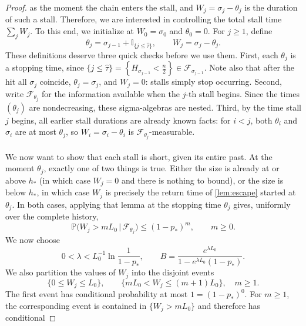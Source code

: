 \documentclass[
    aps,
    superscriptaddress,
    onecolumn,
    10pt,
    prx,
    nofootinbib
]{revtex4-2}
\theoremstyle{namedstatement}
\theoremstyle{plain}
\begin{document}
\begin{proof}
as the moment the chain enters the stall, and $W_j = \sigma_j - \theta_j$ is the duration of such a stall. Therefore, we are interested in controlling the total stall time $\sum_j W_j$. To this end, we initialize at $W_0=\sigma_0$ and
$\theta_0=0$. For $j\ge1$, define
\begin{equation}
  \theta_j=\sigma_{j-1}+\mathbb I_{\{j\le\widehat\tau\}},\qquad W_j=\sigma_j-\theta_j.
\end{equation}
These definitions deserve three quick checks before we use them. First, each $\theta_j$ is a stopping time, since $\{j \le \widehat{\tau}\}= \left\{H_{\sigma_{j-1}} < \frac{n}{2}\right\} \in \mathcal{F}_{\sigma_{j-1}}$. Note also that after the hit all $\sigma_j$ coincide, $\theta_j=\sigma_j$, and $W_j=0$:
stalls simply stop occurring. Second, write $\mathcal F_{\theta_j}$ for
the information available when the $j$-th stall begins. Since the times $(\theta_j)$ are
nondecreasing, these sigma-algebras are nested. Third, by the time stall $j$ begins, all
earlier stall durations are already known facts: for $i<j$, both $\theta_i$ and
$\sigma_i$ are at most $\theta_j$, so $W_i=\sigma_i-\theta_i$ is
$\mathcal{F}_{\theta_j}$-measurable.
\\
\\
We now want to show that each stall is short, given its entire past. At the
moment $\theta_j$, exactly one of two things is true. Either the size is already at or
above $h_\ast$ (in which case $W_j=0$ and there is nothing
to bound), or the size is below $h_\ast$, in which case $W_j$ is precisely the return
time of \cref{lem:escape} started at $\theta_j$. In both cases,
applying that lemma at the stopping time $\theta_j$ gives, uniformly over the complete
history,
\begin{equation}\label{eq:W-tail}
  \mathbb P\big(W_j>mL_0\,\big|\,\mathcal{F}_{\theta_j}\big)\le(1-p_\ast)^m,\qquad m\ge0.
\end{equation}
We now choose
\begin{equation}\label{eq:lambda-B}
  0<\lambda<L_0^{-1}\ln\frac1{1-p_\ast},
  \qquad
  B=\frac{e^{\lambda L_0}}{1-e^{\lambda L_0}(1-p_\ast)}.
\end{equation}
We also partition the values of $W_j$ into the disjoint events
\begin{equation}
  \{0\le W_j\le L_0\},\qquad \{mL_0<W_j\le(m+1)L_0\},\quad m\ge1.
\end{equation}
The first event has conditional probability at most $1=(1-p_\ast)^0$. For $m\ge1$, the
corresponding event is contained in $\{W_j>mL_0\}$ and therefore has conditional

\end{proof}
\end{document}
